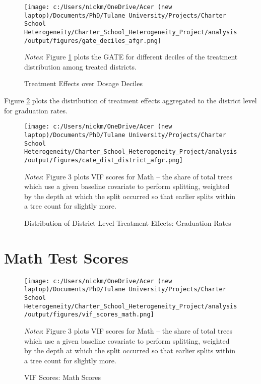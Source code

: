 \documentclass{article} %
\begin{document}
\begin{figure}[!h]
\centering
\texttt{[image: c:/Users/nickm/OneDrive/Acer (new laptop)/Documents/PhD/Tulane University/Projects/Charter School Heterogeneity/Charter\_School\_Heterogeneity\_Project/analysis/output/figures/gate\_deciles\_afgr.png]}
\caption{Treatment Effects over Dosage Deciles}
\label{fig:dosage_afgr}
\begin{minipage}{1\linewidth}
\singlespacing
\footnotesize
\emph{Notes}: Figure \ref{fig:dosage_afgr} plots the GATE for different deciles of the treatment distribution among treated districts.
\end{minipage}
\end{figure}

Figure \ref{fig:treat_dist_district_afgr} plots the distribution of treatment effects aggregated to the district level for graduation rates.

\begin{figure}[!h]
\centering
\texttt{[image: c:/Users/nickm/OneDrive/Acer (new laptop)/Documents/PhD/Tulane University/Projects/Charter School Heterogeneity/Charter\_School\_Heterogeneity\_Project/analysis/output/figures/cate\_dist\_district\_afgr.png]}
\caption{Distribution of District-Level Treatment Effects: Graduation Rates}
\label{fig:treat_dist_district_afgr}
\begin{minipage}{1\linewidth}
\singlespacing
\footnotesize
\emph{Notes}: Figure 3 plots VIF scores for Math -- the share of total trees which use a given baseline covariate to perform splitting, weighted by the depth at which the split occurred so that earlier splits within a tree count for slightly more.  
\end{minipage}
\end{figure}


	\section{Math Test Scores}

\begin{figure}[H]
\centering
\texttt{[image: c:/Users/nickm/OneDrive/Acer (new laptop)/Documents/PhD/Tulane University/Projects/Charter School Heterogeneity/Charter\_School\_Heterogeneity\_Project/analysis/output/figures/vif\_scores\_math.png]}
\caption{VIF Scores: Math Scores}
\label{fig:image3}
\begin{minipage}{1\linewidth}
\singlespacing
\footnotesize
\emph{Notes}: Figure 3 plots VIF scores for Math -- the share of total trees which use a given baseline covariate to perform splitting, weighted by the depth at which the split occurred so that earlier splits within a tree count for slightly more.  
\end{minipage}
\end{figure}
\end{document}

